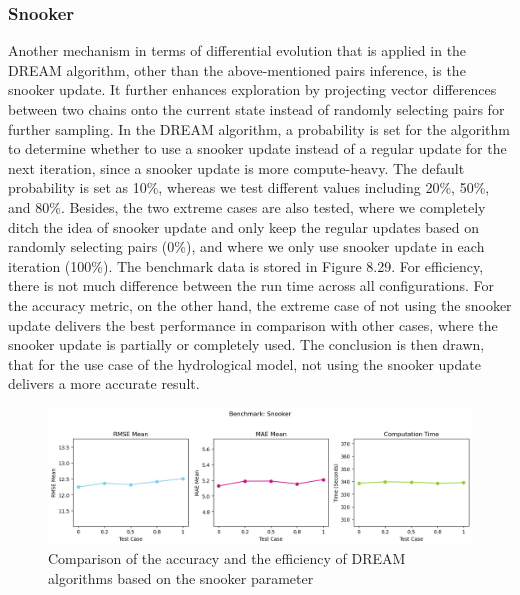 \subsubsection{Snooker}
Another mechanism in terms of differential evolution that is applied in the DREAM algorithm, other than the above-mentioned pairs inference, is the snooker update. It further enhances exploration by projecting vector differences between two chains onto the current state instead of randomly selecting pairs for further sampling. In the DREAM algorithm, a probability is set for the algorithm to determine whether to use a snooker update instead of a regular update for the next iteration, since a snooker update is more compute-heavy. The default probability is set as 10\%, whereas we test different values including 20\%, 50\%, and 80\%. Besides, the two extreme cases are also tested, where we completely ditch the idea of snooker update and only keep the regular updates based on randomly selecting pairs (0\%), and where we only use snooker update in each iteration (100\%). The benchmark data is stored in Figure 8.29. For efficiency, there is not much difference between the run time across all configurations. For the accuracy metric, on the other hand, the extreme case of not using the snooker update delivers the best performance in comparison with other cases, where the snooker update is partially or completely used. The conclusion is then drawn, that for the use case of the hydrological model, not using the snooker update delivers a more accurate result.
\begin{figure}[H]
    \centering
    \includegraphics[width=1\textwidth]{figures/dream/snooker.png}
    \captionsetup{width=.8\textwidth}
    \caption{Comparison of the accuracy and the efficiency of DREAM algorithms based on the snooker parameter}
    \label{fig:enter-label}
\end{figure}

